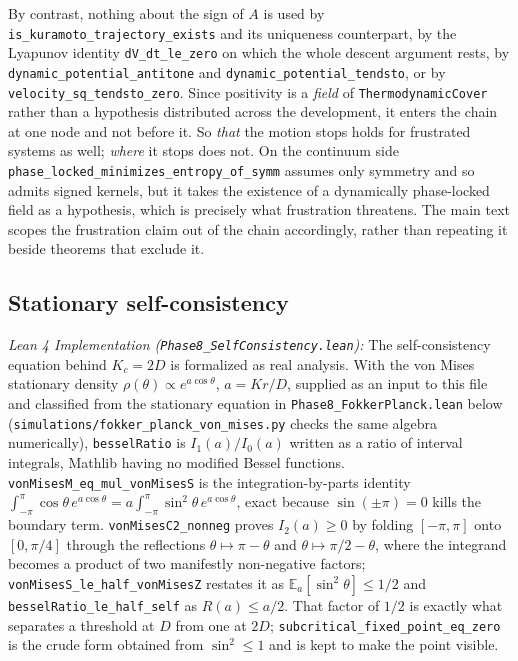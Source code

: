 \documentclass{article}
\begin{document}
By contrast, nothing about the sign of $A$ is used by \nolinkurl{is_kuramoto_trajectory_exists} and its uniqueness counterpart, by the Lyapunov identity \nolinkurl{dV_dt_le_zero} on which the whole descent argument rests, by \nolinkurl{dynamic_potential_antitone} and \nolinkurl{dynamic_potential_tendsto}, or by \nolinkurl{velocity_sq_tendsto_zero}. Since positivity is a \emph{field} of \texttt{ThermodynamicCover} rather than a hypothesis distributed across the development, it enters the chain at one node and not before it. So \emph{that} the motion stops holds for frustrated systems as well; \emph{where} it stops does not. On the continuum side \nolinkurl{phase_locked_minimizes_entropy_of_symm} assumes only symmetry and so admits signed kernels, but it takes the existence of a dynamically phase-locked field as a hypothesis, which is precisely what frustration threatens. The main text scopes the frustration claim out of the chain accordingly, rather than repeating it beside theorems that exclude it.

\subsection{Stationary self-consistency}

\textit{Lean 4 Implementation (\nolinkurl{Phase8_SelfConsistency.lean}):} The self-consistency equation behind $K_c = 2D$ is formalized as real analysis. With the von Mises stationary density $\rho(\theta) \propto e^{a\cos\theta}$, $a = Kr/D$, supplied as an input to this file and classified from the stationary equation in \nolinkurl{Phase8_FokkerPlanck.lean} below (\nolinkurl{simulations/fokker_planck_von_mises.py} checks the same algebra numerically), \texttt{besselRatio} is $I_1(a)/I_0(a)$ written as a ratio of interval integrals, Mathlib having no modified Bessel functions. \nolinkurl{vonMisesM_eq_mul_vonMisesS} is the integration-by-parts identity $\int_{-\pi}^{\pi}\cos\theta\,e^{a\cos\theta} = a\int_{-\pi}^{\pi}\sin^2\!\theta\,e^{a\cos\theta}$, exact because $\sin(\pm\pi) = 0$ kills the boundary term. \nolinkurl{vonMisesC2_nonneg} proves $I_2(a) \ge 0$ by folding $[-\pi,\pi]$ onto $[0,\pi/4]$ through the reflections $\theta \mapsto \pi - \theta$ and $\theta \mapsto \pi/2 - \theta$, where the integrand becomes a product of two manifestly non-negative factors; \nolinkurl{vonMisesS_le_half_vonMisesZ} restates it as $\mathbb{E}_a[\sin^2\theta] \le 1/2$ and \nolinkurl{besselRatio_le_half_self} as $R(a) \le a/2$. That factor of $1/2$ is exactly what separates a threshold at $D$ from one at $2D$; \nolinkurl{subcritical_fixed_point_eq_zero} is the crude form obtained from $\sin^2 \le 1$ and is kept to make the point visible.
\end{document}
